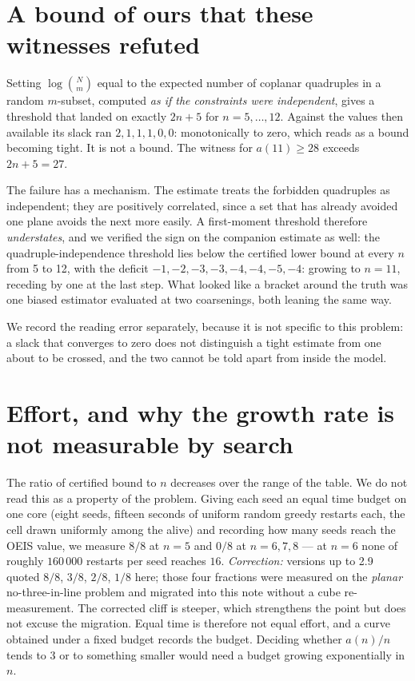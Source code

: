 \documentclass[11pt,a4paper]{article}
\begin{document}
\section{A bound of ours that these witnesses refuted}
Setting $\log\binom{N}{m}$ equal to the expected number of coplanar quadruples in a random
$m$-subset, computed \emph{as if the constraints were independent}, gives a threshold that
landed on exactly $2n+5$ for $n=5,\dots,12$.  Against the values then available its slack ran
$2,1,1,1,0,0$: monotonically to zero, which reads as a bound becoming tight.  It is not a bound.
The witness for $a(11)\ge28$ exceeds $2n+5=27$.

The failure has a mechanism.  The estimate treats the forbidden quadruples as independent; they
are positively correlated, since a set that has already avoided one plane avoids the next more
easily.  A first-moment threshold therefore \emph{understates}, and we verified the sign on the
companion estimate as well: the quadruple-independence threshold lies below the certified lower
bound at every $n$ from 5 to 12, with the deficit $-1,-2,-3,-3,-4,-4,-5,-4$: growing to $n=11$, receding by one at the last step.  What
looked like a bracket around the truth was one biased estimator evaluated at two coarsenings,
both leaning the same way.

We record the reading error separately, because it is not specific to this problem: a slack that
converges to zero does not distinguish a tight estimate from one about to be crossed, and the two
cannot be told apart from inside the model.

\section{Effort, and why the growth rate is not measurable by search}\label{s:effort}
The ratio of certified bound to $n$ decreases over the range of the table.  We do not read this
as a property of the problem.  Giving each seed an equal time budget on one core (eight seeds, fifteen seconds of uniform random
greedy restarts each, the cell drawn uniformly among the alive) and recording how many seeds reach
the OEIS value, we measure $8/8$ at $n=5$ and $0/8$ at $n=6,7,8$ --- at $n=6$ none of roughly
$160\,000$ restarts per seed reaches $16$.  \emph{Correction:} versions up to 2.9 quoted
$8/8$, $3/8$, $2/8$, $1/8$ here; those four fractions were measured on the \emph{planar}
no-three-in-line problem and migrated into this note without a cube re-measurement.  The corrected
cliff is steeper, which strengthens the point but does not excuse the migration.
Equal time is therefore not equal effort, and a curve obtained under a fixed budget records the
budget.  Deciding whether $a(n)/n$ tends to $3$ or to something smaller would need a budget
growing exponentially in $n$.
\end{document}
